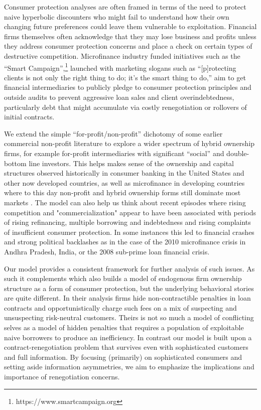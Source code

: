 \documentclass[11pt,english]{article}
\theoremstyle{plain}
\theoremstyle{definition}
\begin{document}
Consumer protection analyses are often framed in terms of the need to protect naive hyperbolic discounters who might fail to understand how their own changing future preferences could leave them vulnerable to exploitation. Financial firms themselves often acknowledge that they may lose business and profits unless they address consumer protection concerns and place a check on certain types of destructive competition. Microfinance
industry funded initiatives such as the ``Smart Campaign'',\footnote{https://www.smartcampaign.org} launched with marketing slogans such as ``{[}p{]}rotecting clients is not only the right thing to do; it's the smart thing to do,'' aim to get financial intermediaries to publicly pledge to consumer protection principles and outside audits to prevent aggressive loan sales and client overindebtedness, particularly debt that might accumulate via costly renegotiation or rollovers of initial contracts.

We extend the simple ``for-profit/non-profit'' dichotomy of some earlier commercial non-profit literature to explore a wider spectrum of hybrid ownership firms, for example for-profit intermediaries with significant  ``social'' and double-bottom line investors. This helps makes sense of the ownership and capital structures observed historically in consumer banking in the United States and other now developed countries, as well as microfinance in developing countries where to this day non-profit
and hybrid ownership forms still dominate most markets \citep{cull2009,conning2011}. The model can also help us think about recent episodes where rising competition and "commercialization" appear to have been associated with periods of rising refinancing, multiple borrowing and indebtedness and rising complaints of insufficient consumer protection. In some instances this led to financial crashes and strong political backlashes as in the case of the 2010 microfinance crisis in Andhra Pradesh, India, or the 2008 sub-prime loan financial crisis.

Our model provides a consistent framework for further analysis of such issues. As such it complements \citet{bubb2013} which also builds a model of endogenous
firm ownership structure as a form of consumer protection, but the
underlying behavioral stories are quite different. In their analysis
firms hide non-contractible penalties in loan contracts and opportunistically
charge such fees on a mix of suspecting and unsuspecting risk-neutral customers. Theirs is not so much a model of conflicting
selves as a model of hidden penalties that requires a population of
exploitable naive borrowers to produce an inefficiency. In contrast
our model is built upon a contract-renegotiation problem that survives even with sophisticated customers and full information. By focusing (primarily) on sophisticated consumers and setting aside information asymmetries, we aim to emphasize the implications and importance of renegotiation concerns.
\end{document}
